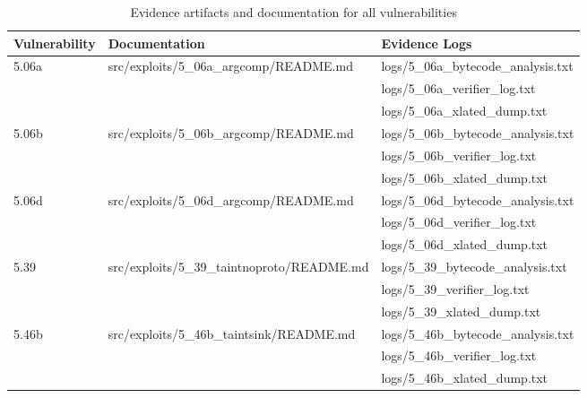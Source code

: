 \begin{table}[h]
\centering
\begin{tabular}{|l|l|l|}
\hline
\textbf{Vulnerability} & \textbf{Documentation} & \textbf{Evidence Logs} \\
\hline
\multirow{2}{*}{5.06a} & src/exploits/5\_06a\_argcomp/README.md & logs/5\_06a\_bytecode\_analysis.txt \\
 &  & logs/5\_06a\_verifier\_log.txt \\
 &  & logs/5\_06a\_xlated\_dump.txt \\
\hline
\multirow{2}{*}{5.06b} & src/exploits/5\_06b\_argcomp/README.md & logs/5\_06b\_bytecode\_analysis.txt \\
 &  & logs/5\_06b\_verifier\_log.txt \\
 &  & logs/5\_06b\_xlated\_dump.txt \\
\hline
\multirow{2}{*}{5.06d} & src/exploits/5\_06d\_argcomp/README.md & logs/5\_06d\_bytecode\_analysis.txt \\
 &  & logs/5\_06d\_verifier\_log.txt \\
 &  & logs/5\_06d\_xlated\_dump.txt \\
\hline
\multirow{2}{*}{5.39} & src/exploits/5\_39\_taintnoproto/README.md & logs/5\_39\_bytecode\_analysis.txt \\
 &  & logs/5\_39\_verifier\_log.txt \\
 &  & logs/5\_39\_xlated\_dump.txt \\
\hline
\multirow{2}{*}{5.46b} & src/exploits/5\_46b\_taintsink/README.md & logs/5\_46b\_bytecode\_analysis.txt \\
 &  & logs/5\_46b\_verifier\_log.txt \\
 &  & logs/5\_46b\_xlated\_dump.txt \\
\hline
\end{tabular}
\caption{Evidence artifacts and documentation for all vulnerabilities}
\end{table}

